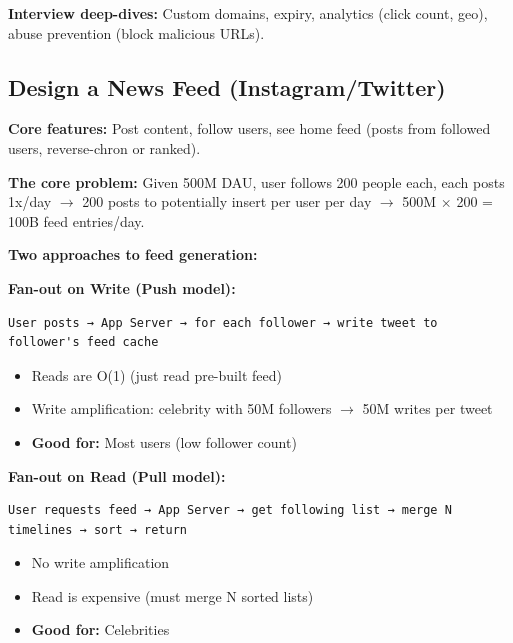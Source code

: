 \documentclass[11pt]{article}
\providecommand{\tightlist}{\setlength{\itemsep}{1pt}\setlength{\parskip}{0pt}}
\begin{document}
\textbf{Interview deep-dives:} Custom domains, expiry, analytics (click count, geo), abuse prevention (block malicious URLs).

\subsection{Design a News Feed (Instagram/Twitter)}\label{design-a-news-feed-instagramtwitter}

\textbf{Core features:} Post content, follow users, see home feed (posts from followed users, reverse-chron or ranked).

\textbf{The core problem:} Given 500M DAU, user follows 200 people each, each posts 1x/day \(\rightarrow\) 200 posts to potentially insert per user per day \(\rightarrow\) 500M \(\times\) 200 = 100B feed entries/day.

\textbf{Two approaches to feed generation:}

\textbf{Fan-out on Write (Push model):}

\setcodelang{}

\begin{verbatim}
User posts → App Server → for each follower → write tweet to follower's feed cache
\end{verbatim}

\begin{itemize}
\tightlist
\item
  Reads are O(1) (just read pre-built feed)
\item
  Write amplification: celebrity with 50M followers \(\rightarrow\) 50M writes per tweet
\item
  \textbf{Good for:} Most users (low follower count)
\end{itemize}

\textbf{Fan-out on Read (Pull model):}

\setcodelang{}

\begin{verbatim}
User requests feed → App Server → get following list → merge N timelines → sort → return
\end{verbatim}

\begin{itemize}
\tightlist
\item
  No write amplification
\item
  Read is expensive (must merge N sorted lists)
\item
  \textbf{Good for:} Celebrities
\end{itemize}
\end{document}
